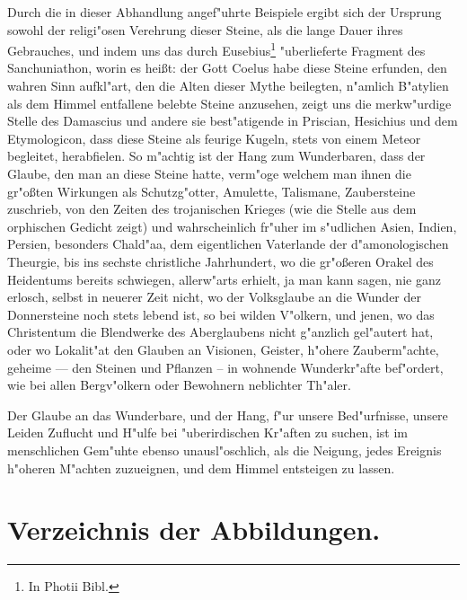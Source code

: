 \documentclass[a4paper, 11pt, oneside, polutonikogreek, german]{article}
\begin{document}
Durch die in dieser Abhandlung angef"uhrte Beispiele ergibt sich der Ursprung sowohl der religi"osen Verehrung dieser Steine, als die lange Dauer ihres Gebrauches, und indem uns das durch Eusebius\footnote{In Photii Bibl.} "uberlieferte Fragment des Sanchuniathon, worin es heißt: der Gott Coelus habe diese Steine erfunden, den wahren Sinn aufkl"art, den die Alten dieser Mythe beilegten, n"amlich B"atylien als dem Himmel entfallene belebte Steine anzusehen, zeigt uns die merkw"urdige Stelle des Damascius und andere sie best"atigende in Priscian, Hesichius und dem Etymologicon, dass diese Steine als feurige Kugeln, stets von einem Meteor begleitet, herabfielen. So m"achtig ist der Hang zum Wunderbaren, dass der Glaube, den man an diese Steine hatte, verm"oge welchem man ihnen die gr"oßten Wirkungen als Schutzg"otter, Amulette, Talismane, Zaubersteine zuschrieb, von den Zeiten des trojanischen Krieges (wie die Stelle aus dem orphischen Gedicht zeigt) und wahrscheinlich fr"uher im s"udlichen Asien, Indien, Persien, besonders Chald"aa, dem eigentlichen Vaterlande der d"amonologischen Theurgie, bis ins sechste christliche Jahrhundert, wo die gr"oßeren Orakel des Heidentums bereits schwiegen, allerw"arts erhielt, ja man kann sagen, nie ganz erlosch, selbst in neuerer Zeit nicht, wo der Volksglaube an die Wunder der Donnersteine noch stets lebend ist, so bei wilden V"olkern, und jenen, wo das Christentum die Blendwerke des Aberglaubens nicht g"anzlich gel"autert hat, oder wo Lokalit"at den Glauben an Visionen, Geister, h"ohere Zauberm"achte, geheime --- den Steinen und Pflanzen -- in wohnende Wunderkr"afte bef"ordert, wie bei allen Bergv"olkern oder Bewohnern neblichter Th"aler.

Der Glaube an das Wunderbare, und der Hang, f"ur unsere Bed"urfnisse, unsere Leiden Zuflucht und H"ulfe bei "uberirdischen Kr"aften zu suchen, ist im menschlichen Gem"uhte ebenso unausl"oschlich, als die Neigung, jedes Ereignis h"oheren M"achten zuzueignen, und dem Himmel entsteigen zu lassen.
\clearpage
\section*{Verzeichnis der Abbildungen.}
\end{document}
